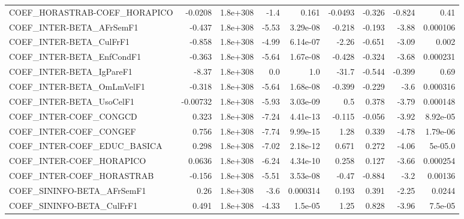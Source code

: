 \begin{tabular}{lrrrrrrrr}
COEF\_HORASTRAB-COEF\_HORAPICO          &     -0.0208 &     1.8e+308 &    -1.4 &    0.161 &    -0.0493 &      -0.326 &       -0.824 &          0.41 \\
COEF\_INTER-BETA\_AFrSemF1              &      -0.437 &     1.8e+308 &   -5.53 & 3.29e-08 &     -0.218 &      -0.193 &        -3.88 &      0.000106 \\
COEF\_INTER-BETA\_CulFrF1               &      -0.858 &     1.8e+308 &   -4.99 & 6.14e-07 &      -2.26 &      -0.651 &        -3.09 &         0.002 \\
COEF\_INTER-BETA\_EnfCondF1             &      -0.363 &     1.8e+308 &   -5.64 & 1.67e-08 &     -0.428 &      -0.324 &        -3.68 &      0.000231 \\
COEF\_INTER-BETA\_IgPareF1              &       -8.37 &     1.8e+308 &     0.0 &      1.0 &      -31.7 &      -0.544 &       -0.399 &          0.69 \\
COEF\_INTER-BETA\_OmLmVelF1             &      -0.318 &     1.8e+308 &   -5.64 & 1.68e-08 &     -0.399 &      -0.229 &         -3.6 &      0.000316 \\
COEF\_INTER-BETA\_UsoCelF1              &    -0.00732 &     1.8e+308 &   -5.93 & 3.03e-09 &        0.5 &       0.378 &        -3.79 &      0.000148 \\
COEF\_INTER-COEF\_CONGCD                &       0.323 &     1.8e+308 &   -7.24 & 4.41e-13 &     -0.115 &      -0.056 &        -3.92 &      8.92e-05 \\
COEF\_INTER-COEF\_CONGEF                &       0.756 &     1.8e+308 &   -7.74 & 9.99e-15 &       1.28 &       0.339 &        -4.78 &      1.79e-06 \\
COEF\_INTER-COEF\_EDUC\_BASICA           &       0.298 &     1.8e+308 &   -7.02 & 2.18e-12 &      0.671 &       0.272 &        -4.06 &       5e-05.0 \\
COEF\_INTER-COEF\_HORAPICO              &      0.0636 &     1.8e+308 &   -6.24 & 4.34e-10 &      0.258 &       0.127 &        -3.66 &      0.000254 \\
COEF\_INTER-COEF\_HORASTRAB             &      -0.156 &     1.8e+308 &   -5.51 & 3.53e-08 &      -0.47 &      -0.884 &         -3.2 &       0.00136 \\
COEF\_SININFO-BETA\_AFrSemF1            &        0.26 &     1.8e+308 &    -3.6 & 0.000314 &      0.193 &       0.391 &        -2.25 &        0.0244 \\
COEF\_SININFO-BETA\_CulFrF1             &       0.491 &     1.8e+308 &   -4.33 &  1.5e-05 &       1.25 &       0.828 &        -3.96 &       7.5e-05 \\

\end{tabular}
